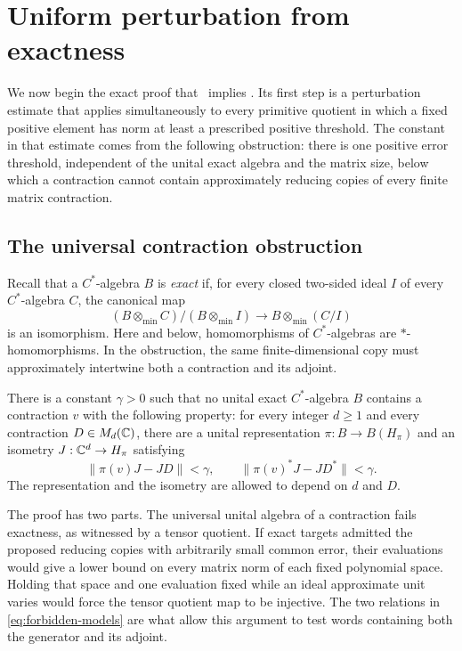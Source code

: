 \section{Uniform perturbation from exactness}\label{sec:exactness}

We now begin the exact proof that \propF\ implies \propP.  Its first
step is a perturbation estimate that applies simultaneously to every
primitive quotient in which a fixed positive element has norm at least
a prescribed positive threshold.  The constant in that estimate comes
from the following obstruction: there is one positive error threshold,
independent of the unital exact algebra and the matrix size,
below which a contraction cannot contain approximately reducing copies
of every finite matrix contraction.

\subsection{The universal contraction obstruction}

Recall that a $C^*$-algebra $B$ is \emph{exact} if, for every closed
two-sided ideal $I$ of every $C^*$-algebra $C$, the canonical map
\[
 (B\otimes_{\min}C)/(B\otimes_{\min}I)
 \longrightarrow B\otimes_{\min}(C/I)
\]
is an isomorphism.  Here and below, homomorphisms of $C^*$-algebras are
$*$-homomorphisms.  In the obstruction, the same finite-dimensional
copy must approximately intertwine both a contraction and its adjoint.

\begin{proposition}\label{prop:uniform-gap}
There is a constant $\gamma>0$ such that no unital exact $C^*$-algebra
$B$ contains a contraction $v$ with the following property: for every
integer $d\geq1$ and every contraction $D\in M_d(\mathbb C)$, there are a unital
representation $\pi:B\to B(H_\pi)$ and an isometry
$J:\mathbb C^d\to H_\pi$ satisfying
\begin{equation}\label{eq:forbidden-models}
 \|\pi(v)J-JD\|<\gamma,
 \qquad
 \|\pi(v)^*J-JD^*\|<\gamma.
\end{equation}
The representation and the isometry are allowed to depend on $d$ and
$D$.
\end{proposition}

The proof has two parts.  The universal unital algebra of a contraction
fails exactness, as witnessed by a tensor quotient.  If exact targets
admitted the proposed reducing copies with arbitrarily small common
error, their evaluations would give a lower bound on every matrix norm
of each fixed polynomial space.  Holding that space and one evaluation
fixed while an ideal approximate unit varies
would force the tensor quotient map to be injective.  The two relations
in \eqref{eq:forbidden-models} are what allow this argument to test words
containing both the generator and its adjoint.

